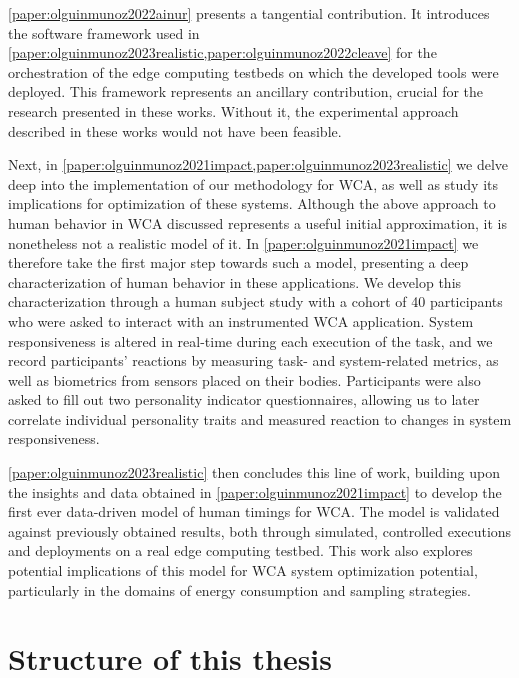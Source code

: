\cref{paper:olguinmunoz2022ainur} presents a tangential contribution.
It introduces the software framework used in \cref{paper:olguinmunoz2023realistic,paper:olguinmunoz2022cleave} for the orchestration of the edge computing testbeds on which the developed tools were deployed.
This framework represents an ancillary contribution, crucial for the research presented in these works.
Without it, the experimental approach described in these works would not have been feasible.

Next, in \cref{paper:olguinmunoz2021impact,paper:olguinmunoz2023realistic} we delve deep into the implementation of our methodology for \gls{WCA}, as well as study its implications for optimization of these systems.
Although the above approach to human behavior in \gls{WCA} discussed represents a useful initial approximation, it is nonetheless not a realistic model of it.
In \cref{paper:olguinmunoz2021impact} we therefore take the first major step towards such a model, presenting a deep characterization of human behavior in these applications.
We develop this characterization through a human subject study with a cohort of \num{40} participants who were asked to interact with an instrumented \gls{WCA} application.
System responsiveness is altered in real-time during each execution of the task, and we record participants' reactions by measuring task- and system-related metrics, as well as biometrics from sensors placed on their bodies.
Participants were also asked to fill out two personality indicator questionnaires, allowing us to later correlate individual personality traits and measured reaction to changes in system responsiveness.

\cref{paper:olguinmunoz2023realistic} then concludes this line of work, building upon the insights and data obtained in \cref{paper:olguinmunoz2021impact} to develop the first ever data-driven model of human timings for \gls{WCA}.
The model is validated against previously obtained results, both through simulated, controlled executions and deployments on a real edge computing testbed.
This work also explores potential implications of this model for \gls{WCA} system optimization potential, particularly in the domains of energy consumption and sampling strategies.

\section{Structure of this thesis}

